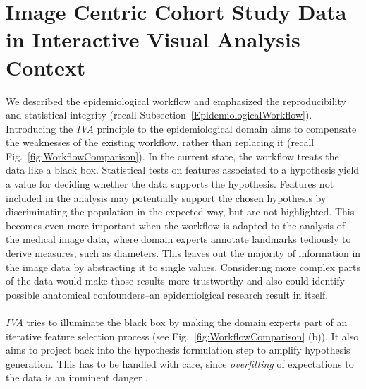 \documentclass[journal]{style/vgtc} 			          %
\begin{document}
\section{Image Centric Cohort Study Data in Interactive Visual Analysis Context} \label{Image Centric Cohort Study Data in Interactive Visual Analysis Context}
We described the epidemiological workflow and emphasized the reproducibility and statistical integrity (recall Subsection~\ref{EpidemiologicalWorkflow}).
%
%
Introducing the \emph{IVA} principle to the epidemiological domain aims to compensate the weaknesses of the existing workflow, rather than replacing it (recall Fig.~\ref{fig:WorkflowComparison}).
%
In the current state, the workflow treats the data like a black box.
%
Statistical tests on features associated to a hypothesis yield a value for deciding whether the data supports the hypothesis.
%
Features not included in the analysis may potentially support the chosen hypothesis by discriminating the population in the expected way, but are not highlighted.
%
This becomes even more important when the workflow is adapted to the analysis of the medical image data, where
domain experts annotate landmarks tediously to derive measures, such as diameters.
%
This leaves out the majority of information in the image data by abstracting it to single values.
%
%
Considering more complex parts of the data would make those results more trustworthy and also could identify possible anatomical confounders--an epidemiolgical research result in itself.
\\\\
\emph{IVA} tries to illuminate the black box by making the domain experts part of an iterative feature selection process (see Fig.~\ref{fig:WorkflowComparison} (b)).
%
It also aims to project back into the hypothesis formulation step to amplify hypothesis generation.
%
This has to be handled with care, since \emph{overfitting} of expectations to the data is an imminent danger \cite{Turkay2013}.
\end{document}
